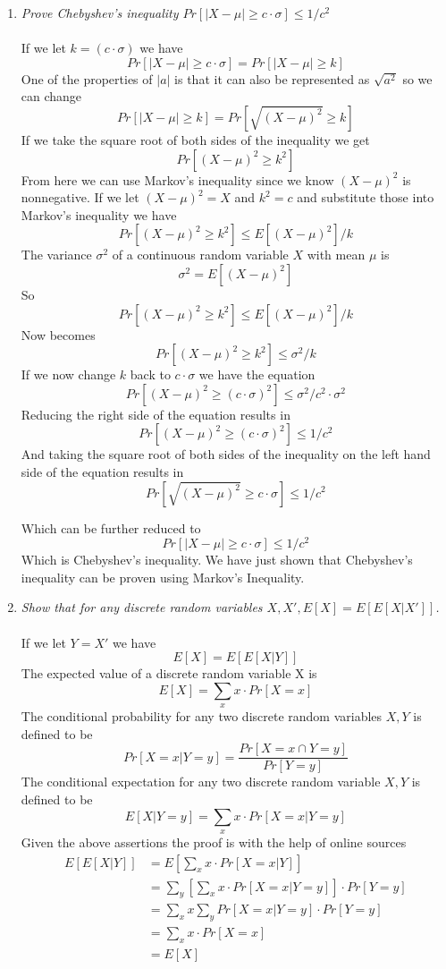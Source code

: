 \documentclass[12pt]{article}
\begin{document}
\begin{enumerate}
\begin{enumerate}
		\newpage
		\item \textit{Prove Chebyshev's inequality $Pr[|X-\mu| \ge c \cdot \sigma] \le 1/c^2$}\\
		\\
		If we let $k = (c \cdot \sigma)$ we have
			$$
			Pr[|X-\mu| \ge c \cdot \sigma] = Pr[|X-\mu| \ge k]
			$$
		One of the properties of $|a|$ is that it can also be represented as $\sqrt{a^2}$ so we can change\\
			$$
			Pr[|X-\mu| \ge k] = Pr[\sqrt{(X-\mu)^2} \ge k]
			$$
		If we take the square root of both sides of the inequality we get
			$$
			Pr[(X-\mu)^2 \ge k^2]
			$$
		From here we can use Markov's inequality since we know $(X-\mu)^2$ is nonnegative.  If we let $(X-\mu)^2 = X$ and $k^2 = c$ and substitute those into Markov's inequality we have 
			$$
			Pr[(X-\mu)^2 \ge k^2] \le E[(X-\mu)^2]/k
			$$
		The variance $\sigma^2$ of a continuous random variable $X$ with mean $\mu$ is 
			$$
			\sigma^2 = E[(X-\mu)^2]
			$$
		So
			$$
			Pr[(X-\mu)^2 \ge k^2] \le E[(X-\mu)^2]/k
			$$
		Now becomes
			$$
			Pr[(X-\mu)^2 \ge k^2] \le \sigma^2/k
			$$
		If we now change $k$ back to $c \cdot \sigma$ we have the equation
			$$
			Pr[(X-\mu)^2 \ge (c \cdot \sigma)^2] \le \sigma^2/c^2 \cdot \sigma^2
			$$
		Reducing the right side of the equation results in
			$$
			Pr[(X-\mu)^2 \ge (c \cdot \sigma)^2] \le 1/c^2
			$$
		And taking the square root of both sides of the inequality on the left hand side of the equation results in
			$$
			Pr[\sqrt{(X-\mu)^2} \ge c \cdot \sigma] \le 1/c^2
			$$ 
		
		Which can be further reduced to 
			$$
			Pr[|X-\mu| \ge c \cdot \sigma] \le 1/c^2
			$$ 
		Which is Chebyshev's inequality.  We have just shown that Chebyshev's inequality can be proven using Markov's Inequality.
		\newpage
		\item \textit{Show that for any discrete random variables $X,X',E[X] = E[E[X|X']]$.}\\
		\\
		If we let $Y = X'$ we have
			$$
			E[X] = E[E[X|Y]]
			$$
		The expected value of a discrete random variable X is
			$$
			E[X] = \sum_{x} x \cdot Pr[X=x]
			$$
		The conditional probability for any two discrete random variables $X,Y$ is defined to be 
			$$
			Pr[X=x|Y=y] = \frac{Pr[X=x \cap Y=y]}{Pr[Y=y]}
			$$
		The conditional expectation for any two discrete random variable $X,Y$ is defined to be
			$$
			E[X|Y=y] = \sum_{x} x \cdot Pr[X=x|Y=y]
			$$
		Given the above assertions the proof is with the help of online sources \cite{4,5,6}
			\begin{align*}
				E[E[X|Y]] &= E[\sum_{x} x \cdot Pr[X=x|Y]]\\
				&=\sum_{y} [\sum_{x} x \cdot Pr[X=x|Y=y]] \cdot Pr[Y=y]\\
				&=\sum_{x} x \sum_{y} Pr[X=x|Y=y] \cdot Pr[Y=y]\\
				&=\sum_{x} x \cdot Pr[X=x]\\
				&=E[X]
			\end{align*}
		

\end{enumerate}
\end{enumerate}
\end{document}
